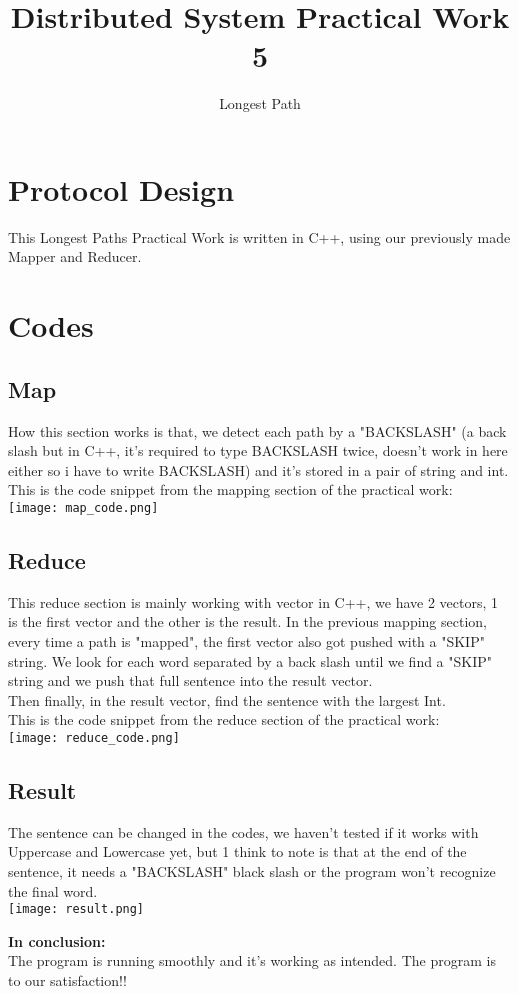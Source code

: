 \documentclass[12pt]{article}
\title{Distributed System Practical Work 5}
\author{Longest Path}
\begin{document}
\maketitle

\tableofcontents
\pagebreak

\section{Protocol Design}
This Longest Paths Practical Work is written in C++, using our previously made Mapper and Reducer.

\section{Codes}
\subsection{Map}
How this section works is that, we detect each path by a "BACKSLASH" (a back slash but in C++, it's required to type BACKSLASH twice, doesn't work in here either so i have to write BACKSLASH) and it's stored in a pair of string and int.\\
This is the code snippet from the mapping section of the practical work: \\
\texttt{[image: map\_code.png]}

\subsection{Reduce}
This reduce section is mainly working with vector in C++, we have 2 vectors, 1 is the first vector and the other is the result. In the previous mapping section, every time a path is "mapped", the first vector also got pushed with a "SKIP" string. We look for each word separated by a back slash until we find a "SKIP" string and we push that full sentence into the result vector. \\
Then finally, in the result vector, find the sentence with the largest Int. \\
This is the code snippet from the reduce section of the practical work: \\
\texttt{[image: reduce\_code.png]}

\subsection{Result}
The sentence can be changed in the codes, we haven't tested if it works with Uppercase and Lowercase yet, but 1 think to note is that at the end of the sentence, it needs a "BACKSLASH" black slash or the program won't recognize the final word.\\
\texttt{[image: result.png]}

\textbf{In conclusion:}\\
The program is running smoothly and it's working as intended. The program is to our satisfaction!!
\end{document}
